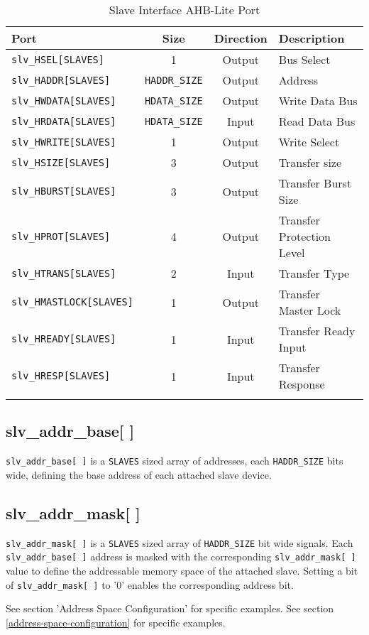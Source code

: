 \begin{longtable}[]{@{}lccl@{}}
\toprule
Port & Size & Direction & Description\tabularnewline
\midrule
\endhead
\texttt{slv\_HSEL[SLAVES]}       & 1                    & Output & Bus Select\tabularnewline
\texttt{slv\_HADDR[SLAVES]}      & \texttt{HADDR\_SIZE} & Output & Address\tabularnewline
\texttt{slv\_HWDATA[SLAVES]}     & \texttt{HDATA\_SIZE} & Output & Write Data Bus\tabularnewline
\texttt{slv\_HRDATA[SLAVES]}     & \texttt{HDATA\_SIZE} & Input  & Read Data Bus\tabularnewline
\texttt{slv\_HWRITE[SLAVES]}     & 1                    & Output & Write Select\tabularnewline
\texttt{slv\_HSIZE[SLAVES]}      & 3                    & Output & Transfer size\tabularnewline
\texttt{slv\_HBURST[SLAVES]}     & 3                    & Output & Transfer Burst Size\tabularnewline
\texttt{slv\_HPROT[SLAVES]}      & 4                    & Output & Transfer Protection Level\tabularnewline
\texttt{slv\_HTRANS[SLAVES]}     & 2                    & Input  & Transfer Type\tabularnewline
\texttt{slv\_HMASTLOCK[SLAVES]}  & 1                    & Output & Transfer Master Lock\tabularnewline
\texttt{slv\_HREADY[SLAVES]}     & 1                    & Input  & Transfer Ready Input\tabularnewline
\texttt{slv\_HRESP[SLAVES]}      & 1                    & Input  & Transfer Response\tabularnewline
\bottomrule
\caption{Slave Interface AHB-Lite Port}
\end{longtable}

\subsection{slv\_addr\_base[ ]}\label{slv_addr_base}

\texttt{slv\_addr\_base[\,]} is a \texttt{SLAVES} sized array of addresses, each
\texttt{HADDR\_SIZE} bits wide, defining the base address of each attached slave device.

\subsection{slv\_addr\_mask[ ]}\label{slv_addr_mask}
\texttt{slv\_addr\_mask[\,]} is a \texttt{SLAVES} sized array of \texttt{HADDR\_SIZE} bit wide
signals. Each \texttt{slv\_addr\_base[\,]} address is masked with the corresponding
\texttt{slv\_addr\_mask[\,]} value to define the addressable memory space of the attached slave.
Setting a bit of \texttt{slv\_addr\_mask[\,]} to '0' enables the corresponding address bit.

\ifdefined\MARKDOWN
  See section 'Address Space Configuration' for specific examples.
\else
  See section \ref{address-space-configuration} for specific examples.
\fi

